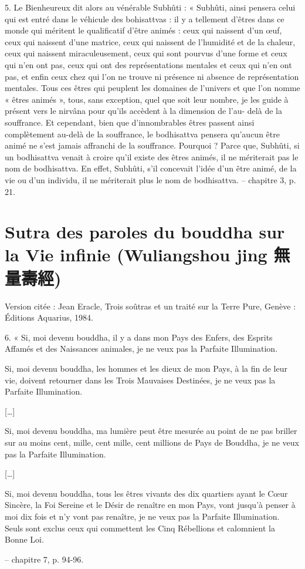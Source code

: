 \begin{singlequote}
    5.	Le Bienheureux dit alors au vénérable Subhûti :
« Subhûti, ainsi pensera celui qui est entré dans le véhicule des bohisattvas : il y a tellement d’êtres dans ce monde qui méritent le qualificatif d’être animés : ceux qui naissent d’un œuf, ceux qui naissent d’une matrice, ceux qui naissent de l’humidité et de la chaleur, ceux qui naissent miraculeusement, ceux qui sont pourvus d’une forme et ceux qui n’en ont pas, ceux qui ont des représentations mentales et ceux qui n’en ont pas, et enfin ceux chez qui l’on ne trouve ni présence ni absence de représentation mentales. Tous ces êtres qui peuplent les domaines de l’univers et que l’on nomme « êtres animés », tous, sans exception, quel que soit leur nombre, je les guide à présent vers le nirvâna pour qu’ils accèdent à la dimension de l’au- delà de la souffrance. Et cependant, bien que d’innombrables êtres passent ainsi complètement au-delà de la souffrance, le bodhisattva pensera qu’aucun être animé ne s’est jamais affranchi de la souffrance. Pourquoi ? Parce que, Subhûti, si un bodhisattva venait à croire qu’il existe des êtres animés, il ne mériterait pas le nom de bodhisattva. En effet, Subhûti, s’il concevait l’idée d’un être animé, de la vie ou d’un individu, il ne mériterait plus le nom de bodhisattva.
-- chapitre 3, p. 21.
\end{singlequote}

\section{Sutra des paroles du bouddha sur la Vie infinie (Wuliangshou jing 無量壽經)}


Version citée : Jean Eracle, Trois soûtras et un traité sur la Terre Pure, Genève : Éditions Aquarius, 1984.

\begin{singlequote}
    6.	« Si, moi devenu bouddha, il y a dans mon Pays des Enfers, des Esprits Affamés et des Naissances animales, je ne veux pas la Parfaite Illumination.

Si, moi devenu bouddha, les hommes et les dieux de mon Pays, à la fin de leur vie, doivent retourner dans les Trois Mauvaises Destinées, je ne veux pas la Parfaite Illumination.
 
[…]

Si, moi devenu bouddha, ma lumière peut être mesurée au point de ne pas briller sur au moins cent, mille, cent mille, cent millions de Pays de Bouddha, je ne veux pas la Parfaite Illumination.

[…]

Si, moi devenu bouddha, tous les êtres vivants des dix quartiers ayant le Cœur Sincère, la Foi Sereine et le Désir de renaître en mon Pays, vont jusqu’à penser à moi dix fois et n’y vont pas renaître, je ne veux pas la Parfaite Illumination. Seuls sont exclus ceux qui commettent les Cinq Rébellions et calomnient la Bonne Loi.

-- chapitre 7, p. 94-96.
\end{singlequote}




